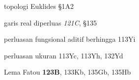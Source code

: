

topologi Euklides \S1A2


































garis real diperluas {\it 121C}, \S135



perluasan fungsional aditif berhingga 113Yi



perluasan ukuran 113Yc, 113Yh, 132Yd

















\indexmedskip















Lema Fatou {\bf 123B}, 133Kb, 135Gb, 135Hb




















